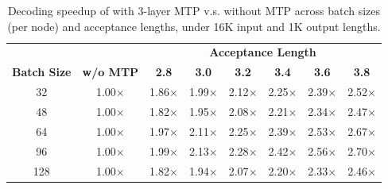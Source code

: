 \begin{table}[t!]
\small
    \centering
    \begin{tabular}{c|c|cccccc}
        \toprule
         & & \multicolumn{6}{c}{\textbf{Acceptance Length}} \\
        \multirow{-2}{*}{\textbf{Batch Size}} & \multirow{-2}{*}{\textbf{w/o MTP}} & \textbf{2.8} & \textbf{3.0} & \textbf{3.2} & \textbf{3.4} & \textbf{3.6} & \textbf{3.8} \\
        \midrule
        32 & 1.00$\times$ & 1.86$\times$ & 1.99$\times$ & 2.12$\times$ & 2.25$\times$ & 2.39$\times$ & 2.52$\times$ \\
        48 & 1.00$\times$ & 1.82$\times$ & 1.95$\times$ & 2.08$\times$ & 2.21$\times$ & 2.34$\times$ & 2.47$\times$ \\
        64 & 1.00$\times$ & 1.97$\times$ & 2.11$\times$ & 2.25$\times$ & 2.39$\times$ & 2.53$\times$ & 2.67$\times$ \\
        96 & 1.00$\times$ & 1.99$\times$ & 2.13$\times$ & 2.28$\times$ & 2.42$\times$ & 2.56$\times$ & 2.70$\times$ \\
        128 & 1.00$\times$ & 1.82$\times$ & 1.94$\times$ & 2.07$\times$ & 2.20$\times$ & 2.33$\times$ & 2.46$\times$ \\
        \bottomrule
    \end{tabular}
    \caption{Decoding speedup of \mimoflash{} with 3-layer MTP v.s. without MTP across batch sizes (per node) and acceptance lengths, under 16K input and 1K output lengths.}
    \label{tab:mtp_speedup}
    
\end{table}

